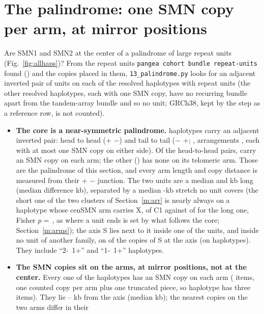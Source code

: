 \section{The  palindrome: one SMN copy per arm, at mirror positions}\label{sec:palindrome}
Are SMN1 and SMN2 at the center of a palindrome of large repeat units (Fig.~\ref{fig:allhaps})? From the repeat units
\texttt{pangea cohort bundle repeat-units} found () and the copies placed in
them, \texttt{13\_palindrome.py} looks for an adjacent inverted pair of  units on each of the \palHaps{}
resolved haplotypes with repeat units (the other \palNoUnits{} resolved haplotypes, each with one SMN copy, have no
recurring bundle apart from the tandem-array bundle and so no unit; GRCh38, kept by the step as a reference row, is not counted).
\begin{itemize}
\item \textbf{The core is a near-symmetric palindrome.} \palAdj{} haplotypes carry an adjacent inverted  pair:
\palHead{} head to head (+ $-$) and \palTail{} tail to tail ($-$ +; \palTailHaps, arrangements \palTailArr, each
with at most one SMN copy on either side). Of the head-to-head pairs, \palPair{} carry an SMN copy on each arm; the other
(\palNoCopyHap) has none on its telomeric arm. Those \palPair{} are the palindrome of this section, and every arm
length and copy distance is measured from their + $-$ junction. The two  units are a median \palArmL{} and
\palArmR{} kb long (median difference \palArmDiff{} kb), separated by a median \palGap-kb stretch no unit covers (the short one of the two clusters of Section~\ref{m:arr} is nearly always on a haplotype whose cenSMN arm carries X, \palGapShortCOne{} of \palGapShortN{} C1 against \palGapLongCOne{} of \palGapLongN{} for the long one, Fisher $p=$\,\palGapTypeP, as where a unit ends is set by what follows the core; Section~\ref{m:arms}); the axis S
lies next to it inside one of the  units, and inside no unit of another family, on \palSinA{} of the \palGapSN{} copies of S at the axis (on \palGapSHaps{} haplotypes).
They include \palTwoOne{} ``2-~1+'' and \palOneOne{} ``1-~1+'' haplotypes.
\item \textbf{The SMN copies sit on the arms, at mirror positions, not at the center.} Every one of the \palPair{}
haplotypes has an SMN copy on each arm (\palCopies{} items, one counted copy per arm plus one truncated piece, so \palThreeCopy{} haplotype has three items). They lie
\palDmin--\palDmax{} kb from the axis (median \palDmed{} kb); the nearest copies on the two arms differ in their

\end{itemize}
